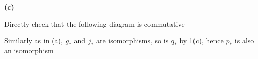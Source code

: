 \documentclass[../main.tex]{subfiles}
\begin{document}
\textbf{(c)} \par
Directly check that the following diagram is commutative \par
\begin{center}
\end{center}
\par
Similarly as in (a), $g_*$ and $j_*$ are isomorphisms, so is $q_*$ by 1(c), hence $p_*$ is also an isomorphism \par
\end{document}
